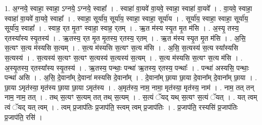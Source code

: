 \documentclass[17pt]{extarticle}
\begin{document}
1. अ॒ग्नये॒ स्वाहा॒ स्वाहा॒ ऽग्नये॒ ऽग्नये॒ स्वाहा᳚ । . स्वाहा॑ वा॒यवे॑ वा॒यवे॒ स्वाहा॒ स्वाहा॑ वा॒यवे᳚ । . वा॒यवे॒ स्वाहा॒ स्वाहा॑ वा॒यवे॑ वा॒यवे॒ स्वाहा᳚ । . स्वाहा॒ सूर्या॑य॒ सूर्या॑य॒ स्वाहा॒ स्वाहा॒ सूर्या॑य । . सूर्या॑य॒ स्वाहा॒ स्वाहा॒ सूर्या॑य॒ सूर्या॑य॒ स्वाहा᳚ । . स्वाह॒ र्‌त मृ॒तꣳ स्वाहा॒ स्वाह॒ र्‌तम् । . ऋ॒त म॑स्य स्यृ॒त मृ॒त म॑सि । . अ॒स्यृ॒ तस्य॒ र्‌तस्या᳚स्य स्यृ॒तस्य॑ । . ऋ॒तस्य॒ र्‌त मृ॒त मृ॒तस्य॒ र्‌तस्य॒ र्‌तम् । . ऋ॒त म॑स्य स्यृ॒त मृ॒त म॑सि । . अ॒सि॒ स॒त्यꣳ स॒त्य म॑स्यसि स॒त्यम् । . स॒त्य म॑स्यसि स॒त्यꣳ स॒त्य म॑सि । . अ॒सि॒ स॒त्यस्य॑ स॒त्य स्या᳚स्यसि स॒त्यस्य॑ । . स॒त्यस्य॑ स॒त्यꣳ स॒त्यꣳ स॒त्यस्य॑ स॒त्यस्य॑ स॒त्यम् । . स॒त्य म॑स्यसि स॒त्यꣳ स॒त्य म॑सि । . अ॒स्यृ॒तस्य॒ र्‌तस्या᳚स्य स्यृ॒तस्य॑ । . ऋ॒तस्य॒ पन्थाः॒ पन्था॑ ऋ॒तस्य॒ र्‌तस्य॒ पन्थाः᳚ । . पन्था॑ अस्यसि॒ पन्थाः॒ पन्था॑ असि । . अ॒सि॒ दे॒वाना᳚म् दे॒वाना॑ मस्यसि दे॒वाना᳚म् । . दे॒वाना᳚म् छा॒या छा॒या दे॒वाना᳚म् दे॒वाना᳚म् छा॒या । . छा॒या ऽमृत॑स्या॒ मृत॑स्य छा॒या छा॒या ऽमृत॑स्य । . अ॒मृत॑स्य॒ नाम॒ नामा॒ मृत॑स्या॒ मृत॑स्य॒ नाम॑ । . नाम॒ तत् तन् नाम॒ नाम॒ तत् । . तथ् स॒त्यꣳ स॒त्यम् तत् तथ् स॒त्यम् । . स॒त्यं ॅयद् यथ् स॒त्यꣳ स॒त्यं ॅयत् । . यत् त्वम् त्वं ॅयद् यत् त्वम् । . त्वम् प्र॒जाप॑तिः प्र॒जाप॑ति॒ स्त्वम् त्वम् प्र॒जाप॑तिः । . प्र॒जाप॑ति॒ रस्यसि॑ प्र॒जाप॑तिः प्र॒जाप॑ति॒ रसि॑ । \newline
\end{document}

